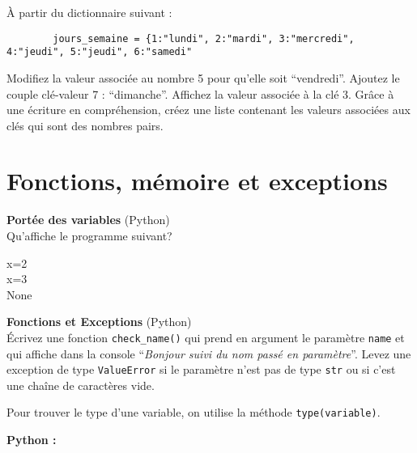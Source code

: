 \begin{Exercice}[5 minutes]
    À partir du dictionnaire suivant :
    \begin{lstlisting}
        jours_semaine = {1:"lundi", 2:"mardi", 3:"mercredi", 4:"jeudi", 5:"jeudi", 6:"samedi" \end{lstlisting}

Modifiez la valeur associée au nombre 5 pour qu’elle soit ``vendredi''. Ajoutez le couple clé-valeur 7 : ``dimanche''. Affichez la valeur associée à la clé 3.
Grâce à une écriture en compréhension, créez une liste contenant les valeurs associées aux clés qui sont des nombres pairs.

    \begin{solution}
        
    \end{solution}
\end{Exercice}


\section{Fonctions, mémoire et exceptions}
\begin{Exercice}[5 minutes] \textbf{Portée des variables} (Python)\\
    Qu'affiche le programme suivant? \\

    

    \begin{solution}
            x=2 \\
            x=3 \\
            None
    \end{solution}

    
 \end{Exercice}

 \begin{Exercice}[10 minutes]\textbf{Fonctions et Exceptions} (Python)\\

    Écrivez une fonction \lstinline{check_name()} qui prend en argument le paramètre \lstinline{name} et qui affiche dans la console ``\textit{Bonjour suivi du nom passé en paramètre}''.
    Levez une exception de type \lstinline{ValueError} si le paramètre n'est pas de type \lstinline{str} ou si c'est une chaîne de caractères vide.

    \begin{conseil}
       Pour trouver le type d'une variable, on utilise la méthode \lstinline{type(variable)}.
    \end{conseil}
    
    \begin{solution}   
        \textbf{Python :}
        
    \end{solution}
    
    \end{Exercice}

